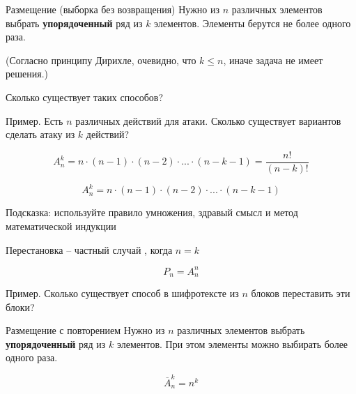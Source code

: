 \begin{frame}{Размещение (выборка без возвращения)}
Нужно из
$n$
различных элементов 
выбрать \textbf{упорядоченный}
ряд из $k$
элементов. 
Элементы берутся не более одного раза.

(Согласно принципу Дирихле, очевидно, что $k \leqslant n$,
иначе задача не имеет решения.)


Сколько существует таких способов?   

Пример.
Есть $n$ различных действий для атаки.
Сколько существует вариантов сделать атаку из $k$ действий?

\begin{equation}
A_n^k = n \cdot (n-1) \cdot (n-2) \cdot ... \cdot (n-k-1) = \frac{n!} {\left(n-k\right)!}
\end{equation}    


\end{frame}

\begin{frame}


\begin{equation}
A_n^k = n \cdot (n-1) \cdot (n-2) \cdot ... \cdot (n-k-1)
\end{equation}  

Подсказка: используйте правило умножения, здравый смысл 
и метод математической индукции

\end{frame}



\begin{frame}{Перестановка}
 -- 
частный случай , 
когда $n=k$ 

\begin{equation}
P_n = A_n^n
\end{equation}

Пример. Сколько существует способ в шифротексте из $n$ блоков переставить эти блоки?
\end{frame}


\begin{frame}{Размещение с повторением}
Нужно из
$n$
различных элементов 
выбрать \textbf{упорядоченный}
ряд из $k$
элементов. 
При этом элементы можно выбирать более одного раза.

\begin{equation}
\overline{A}_n^k = n ^ k
\end{equation} 

\end{frame}

